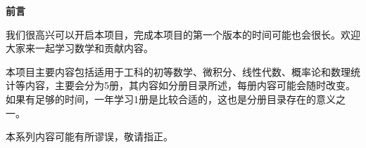\begin{center}
    \Large \textbf{前言}
\end{center}

我们很高兴可以开启本项目，完成本项目的第一个版本的时间可能也会很长。欢迎大家来一起学习数学和贡献内容。

本项目主要内容包括适用于工科的初等数学、微积分、线性代数、概率论和数理统计等内容，主要会分为5册，其内容如分册目录所述，每册内容可能会随时改变。如果有足够的时间，一年学习1册是比较合适的，这也是分册目录存在的意义之一。

本系列内容可能有所谬误，敬请指正。
